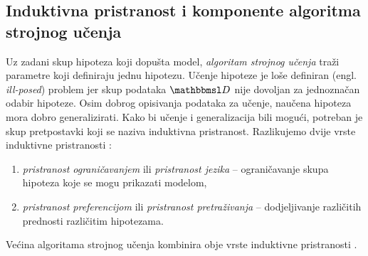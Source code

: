 \documentclass[utf8, diplomski, lmodern]{fer}
\begin{document}
\subsection{Induktivna pristranost i komponente algoritma strojnog učenja}

Uz zadani skup hipoteza koji dopušta model, \emph{algoritam strojnog učenja} traži parametre koji definiraju jednu hipotezu. Učenje hipoteze je loše definiran (engl. \textit{ill-posed}) problem jer skup podataka $\set{D}$ nije dovoljan za jednoznačan odabir hipoteze. Osim dobrog opisivanja podataka za učenje, naučena hipoteza mora dobro generalizirati. Kako bi učenje i generalizacija bili mogući, potreban je skup pretpostavki koji se naziva induktivna pristranost. Razlikujemo dvije vrste induktivne pristranosti \citep{Snajder:2014:SU}:
\begin{enumerate}
	\item \emph{pristranost ograničavanjem} ili \emph{pristranost jezika} -- ograničavanje skupa hipoteza koje se mogu prikazati modelom,
	\item \emph{pristranost preferencijom} ili \emph{pristranost pretraživanja} -- dodjeljivanje različitih prednosti različitim hipotezama.
\end{enumerate}
Većina algoritama strojnog učenja kombinira obje vrste induktivne pristranosti \citep{Snajder:2014:SU}.
\end{document}

